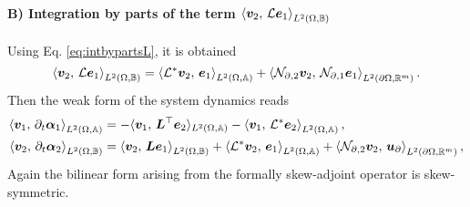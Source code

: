 \paragraph{B) Integration by parts of the term $\inner[L^2(\Omega, \mathbb{B})]{\bm{v}_2}{\mathcal{L}\bm{e}_1}$}
Using Eq. \eqref{eq:intbypartsL}, it is obtained 
\begin{equation}
\inner[L^2(\Omega, \mathbb{B})]{\bm{v}_2}{\mathcal{L}\bm{e}_1} = \inner[L^2(\Omega, \mathbb{A})]{\mathcal{L}^*\bm{v}_2}{\bm{e}_1} + \inner[L^2(\partial \Omega, \mathbb{R}^m)]{\mathcal{N}_{\partial, 2} \bm{v}_2}{\mathcal{N}_{\partial, 1} \bm{e}_1}.
\end{equation}
Then the weak form of the system dynamics  reads 
\begin{equation}\label{eq:weak_dyn_intJ2}
\begin{aligned}
\inner[L^2(\Omega, \mathbb{A})]{\bm{v}_1}{\partial_t \bm{\alpha}_1} &=   -  \langle{\bm{v}_1}, \,{\bm{L}^\top \bm{e}_2}\rangle_{L^2(\Omega, \mathbb{A})}  -\inner[L^2(\Omega, \mathbb{A})]{\bm{v}_1}{\mathcal{L}^*\bm{e}_2}, \\
\inner[L^2(\Omega, \mathbb{B})]{\bm{v}_2}{\partial_t \bm{\alpha}_2} &=   \inner[L^2(\Omega, \mathbb{B})]{\bm{v}_2}{\bm{L}\bm{e}_1}  + \inner[L^2(\Omega, \mathbb{A})]{\mathcal{L}^*\bm{v}_2}{\bm{e}_1} + \inner[L^2(\partial \Omega, \mathbb{R}^m)]{\mathcal{N}_{\partial, 2} \bm{v}_2}{\bm{u}_{\partial}}, \\
\end{aligned}
\end{equation}
Again the bilinear form arising from the formally skew-adjoint operator is skew-symmetric.
